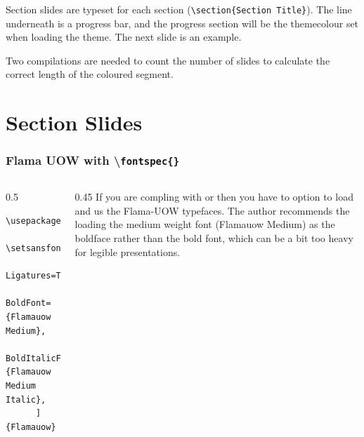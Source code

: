 \documentclass[aspectratio=169]{beamer}
\newcommand{\command}[1]{\texttt{\color{UOWdarkgreen}#1}}
\begin{document}
\begin{frame}
   Section slides are typeset for each section (\command{\textbackslash{}section\{Section Title\}}). The line underneath is a progress bar, and the progress section will be the themecolour set when loading the theme. The next slide is an example. 
   
   Two compilations are needed to count the number of slides to calculate the correct length of the coloured segment.
\end{frame}


\section{Section Slides}


\begin{frame}[fragile]
   \frametitle{Flama UOW with \textbackslash\texttt{fontspec\{\}}}
   \begin{columns}
      \begin{column}{0.5\textwidth}
         \footnotesize
\begin{verbatim}
\usepackage{fontspec}
   \setsansfont[%
      Ligatures=TeX,
      BoldFont={Flamauow Medium},
      BoldItalicFont={Flamauow Medium Italic},
      ]{Flamauow}
\end{verbatim}
      \end{column}
      \begin{column}{0.45\textwidth}
         If you are compling with \XeLaTeX{} or \LuaLaTeX{} then you have to option to load and us the Flama-UOW typefaces. The author recommends the loading the medium weight font (Flamauow Medium) as the boldface rather than the bold font, which can be a bit too heavy for legible presentations. 
      \end{column}
   \end{columns}
\end{frame}
\end{document}
